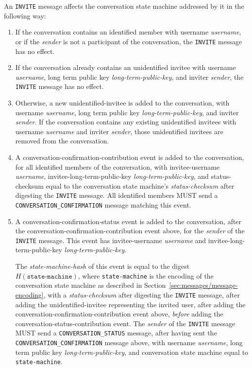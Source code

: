 \documentclass{article}
\def\message#1{\texttt{#1}}
\def\field#1{\textit{#1}}
\def\smfield#1{\textsl{#1}}
\def\type#1{\textsf{#1}}
\begin{document}
An \message{INVITE} message affects the conversation state machine addressed by it in the following way:
\begin{enumerate}
\item If the conversation contains an identified member with username \field{username}, or if the \field{sender} is not a participant of the conversation, the \message{INVITE} message has no effect.
\item If the conversation already contains an unidentified invitee with username \field{username}, long term public key \field{long-term-public-key}, and inviter \field{sender}, the \message{INVITE} message has no effect.
\item Otherwise, a new \type{unidentified-invitee} is added to the conversation, with username \field{username}, long term public key \field{long-term-public-key}, and inviter \field{sender}. If the conversation contains any existing unidentified invitees with username \field{username} and inviter \field{sender}, those unidentified invitees are removed from the conversation.
\item A \type{conversation-confirmation-contribution} event is added to the conversation, for all identified members of the conversation, with invitee-username \field{username}, invitee-long-term-public-key \field{long-term-public-key}, and status-checksum equal to the conversation state machine's \smfield{status-checksum} after digesting the \message{INVITE} message. All identified members MUST send a \message{CONVERSATION\_CONFIRMATION} message matching this event.
\item A \type{conversation-confirmation-status} event is added to the conversation, after the \type{conversation-confirmation-contribution} event above, for the \field{sender} of the \message{INVITE} message. This event has invitee-username \field{username} and invitee-long-term-public-key \field{long-term-public-key}.

The \smfield{state-machine-hash} of this event is equal to the digest $H(\texttt{state-machine})$, where \texttt{state-machine} is the encoding of the conversation state machine as described in Section~\ref{sec:messages/message-encoding}, with a \smfield{status-checksum} after digesting the \message{INVITE} message, after adding the \type{unidentified-invitee} representing the invited user, after adding the \type{conversation-confirmation-contribution} event above, \emph{before} adding the \type{conversation-status-contribution} event.
The \field{sender} of the \message{INVITE} message MUST send a \message{CONVERSATION\_STATUS} message, after having sent the \message{CONVERSATION\_CONFIRMATION} message above, with username \field{username}, long term public key \field{long-term-public-key}, and conversation state machine equal to \texttt{state-machine}.
\label{item:messages/invite/conversation-status-event}
\end{enumerate}
\end{document}
